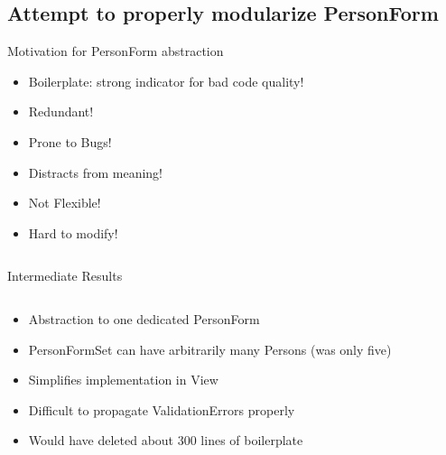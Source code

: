 \subsection{Attempt to properly modularize PersonForm}
\begin{frame}[c]{Motivation for PersonForm abstraction}
    \begin{multicols}{2}
    \tiny
        \phantom{M}
    \large
        \begin{itemize}[<+(1)->]
            \item Boilerplate: strong indicator for bad code quality!
            \item Redundant!
            \item Prone to Bugs!
            \item Distracts from meaning!
            \item Not Flexible!
            \item Hard to modify!
        \end{itemize}
    \tiny
    \phantom{M}
    \inputminted[linenos,xleftmargin=2em]{python}{code/personform.py}
    \end{multicols}
\end{frame}


\begin{frame}[c]{Intermediate Results}
    \begin{multicols}{2}
        \tiny
        \inputminted[linenos]{python}{code/personforms.py}
        \normalsize
        \begin{itemize}[<+(1)->]
            \item Abstraction to one dedicated PersonForm
            \item PersonFormSet can have arbitrarily many Persons (was only five)
            \item Simplifies implementation in View
            \item Difficult to propagate ValidationErrors properly
            \item Would have deleted about 300 lines of boilerplate
        \end{itemize}
    \end{multicols}
\end{frame}

